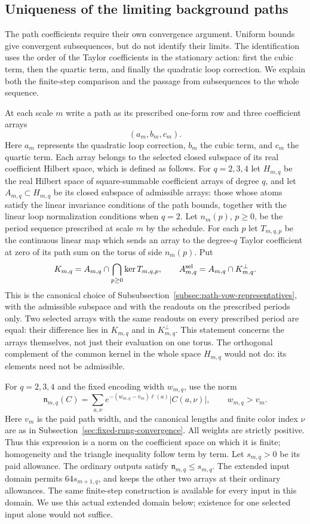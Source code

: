 \subsection{Uniqueness of the limiting background paths}
\label{sec:background-path-convergence}
The path coefficients require their own convergence argument. Uniform
bounds give convergent subsequences, but do not identify their limits.
The identification uses the order of the Taylor coefficients in the
stationary action: first the cubic term, then the quartic term, and
finally the quadratic loop correction. We explain both the finite-step
comparison and the passage from subsequences to the whole sequence.

At each scale $m$ write a path as its prescribed one-form row and three
coefficient arrays
\[
                    (a_m,b_m,c_m).
\]
Here $a_m$ represents the quadratic loop correction, $b_m$ the cubic
term, and $c_m$ the quartic term. Each array belongs to the selected
closed subspace of its real coefficient Hilbert space, which is
defined as follows. For $q=2,3,4$ let $H_{m,q}$ be the real Hilbert
space of square-summable coefficient arrays of degree $q$, and let
$A_{m,q}\subset H_{m,q}$ be its closed subspace of admissible arrays:
those whose atoms satisfy the linear invariance conditions of the path
bounds, together with the linear loop normalization conditions when
$q=2$. Let $n_m(p)$, $p\ge0$, be the period sequence prescribed at
scale $m$ by the schedule. For each $p$ let $T_{m,q,p}$ be the
continuous linear map which sends an array to the degree-$q$ Taylor
coefficient at zero of its path sum on the torus of side $n_m(p)$. Put
\[
 K_{m,q}=A_{m,q}\cap\bigcap_{p\ge0}\ker T_{m,q,p},
 \qquad
 A^{\rm sel}_{m,q}=A_{m,q}\cap K_{m,q}^{\perp}.
\]
This is the canonical choice of
Subsubsection~\ref{subsec:path-vow-representatives}, with the admissible
subspace and with the readouts on the prescribed periods only.
Two selected arrays with the same readouts on every prescribed period
are equal: their difference lies in $K_{m,q}$ and in $K_{m,q}^\perp$.
This statement concerns the arrays themselves, not just their
evaluation on one torus. The orthogonal complement of the common
kernel in the whole space $H_{m,q}$ would not do: its elements need
not be admissible.

For $q=2,3,4$ and the fixed encoding width $w_{m,q}$, use the norm
\[
 \mathfrak n_{m,q}(C)
   =\sum_{a,\nu}e^{-(w_{m,q}-v_m)\ell(a)}|C(a,\nu)|,
 \qquad w_{m,q}>v_m.
\]
Here $v_m$ is the paid path width, and the canonical lengths and finite
color index $\nu$ are as in Subsection~\ref{sec:fixed-rung-convergence}.
All weights are strictly positive. Thus this expression is a norm on
the coefficient space on which it is finite; homogeneity and the
triangle inequality follow term by term. Let $s_{m,q}>0$ be its paid
allowance. The ordinary outputs satisfy
$\mathfrak n_{m,q}\le s_{m,q}$. The extended input domain permits
$64s_{m+1,q}$, and keeps the other two arrays at their ordinary
allowances. The same finite-step construction is available for every
input in this domain. We use this actual extended domain below;
existence for one selected input alone would not suffice.

